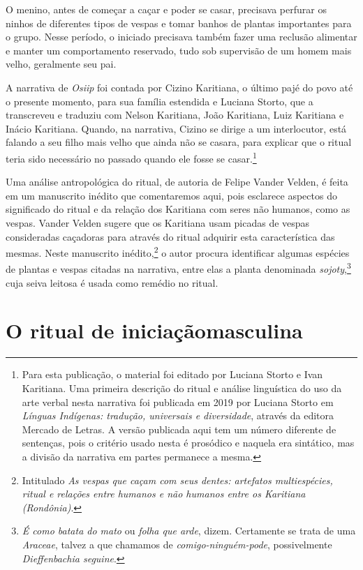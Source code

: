 O menino, antes de começar a caçar e
 poder se casar, precisava perfurar os ninhos de diferentes tipos de
 vespas e tomar banhos de plantas importantes para o grupo. Nesse
 período, o iniciado precisava também fazer uma reclusão alimentar e
 manter um comportamento reservado, tudo sob supervisão de um homem mais
 velho, geralmente seu pai.

 A narrativa de \textit{Osiip} foi contada por Cizino Karitiana, o último pajé do
 povo até o presente momento, para sua família estendida e Luciana
 Storto, que a transcreveu e traduziu com Nelson Karitiana, João
 Karitiana, Luiz Karitiana e Inácio Karitiana. Quando, na narrativa,
 Cizino se dirige a um interlocutor, está falando a seu filho mais velho
 que ainda não se casara, para explicar que o ritual teria sido
 necessário no passado quando ele fosse se casar.\footnote{Para esta publicação, o
 material foi editado por Luciana Storto e Ivan Karitiana. Uma primeira descrição do ritual e análise linguística do uso da arte
 verbal nesta narrativa foi publicada em 2019 por Luciana Storto em
 \textit{Línguas Indígenas: tradução, universais e diversidade}, através da
 editora Mercado de Letras. A versão publicada aqui tem um número
 diferente de sentenças, pois o critério usado nesta é prosódico e
 naquela era sintático, mas a divisão da narrativa em partes permanece a
 mesma.}

\pagebreak
\thispagestyle{empty}

 Uma análise antropológica do ritual, de autoria de Felipe Vander Velden,
 é feita em um manuscrito inédito que comentaremos aqui, pois esclarece
 aspectos do significado do ritual e da relação dos Karitiana com seres
 não humanos, como as vespas. Vander Velden sugere que os Karitiana usam
 picadas de vespas consideradas caçadoras para através do ritual adquirir
 esta característica das mesmas. Neste manuscrito inédito,\footnote{Intitulado \textit{As vespas que caçam com seus dentes: artefatos multiespécies, ritual e
 relações entre humanos e não humanos entre os Karitiana (Rondônia)}.} o
 autor procura identificar algumas espécies de plantas e vespas citadas
 na narrativa, entre elas a planta denominada \textit{sojoty},\footnote{\textit{É como batata do mato} ou \textit{folha que arde},
 dizem. Certamente se trata de uma \textit{Araceae}, talvez a que chamamos
 de \textit{comigo-ninguém-pode}, possivelmente \textit{Dieffenbachia
 seguine}.} cuja seiva
 leitosa é usada como remédio no ritual.
 \vspace*{\fill}

 \chapter[O ritual de iniciação masculina]{O ritual de iniciação\break masculina}
 
